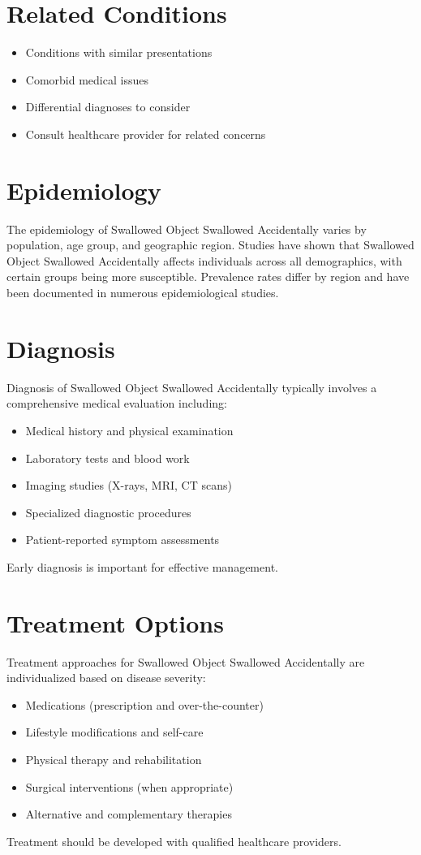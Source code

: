\section*{Related Conditions}
\begin{itemize}
  \item Conditions with similar presentations
  \item Comorbid medical issues
  \item Differential diagnoses to consider
  \item Consult healthcare provider for related concerns
\end{itemize}

\section*{Epidemiology}
The epidemiology of Swallowed Object Swallowed Accidentally varies by population, age group, and geographic region. Studies have shown that Swallowed Object Swallowed Accidentally affects individuals across all demographics, with certain groups being more susceptible. Prevalence rates differ by region and have been documented in numerous epidemiological studies.

\section*{Diagnosis}
Diagnosis of Swallowed Object Swallowed Accidentally typically involves a comprehensive medical evaluation including:
\begin{itemize}
  \item Medical history and physical examination
  \item Laboratory tests and blood work
  \item Imaging studies (X-rays, MRI, CT scans)
  \item Specialized diagnostic procedures
  \item Patient-reported symptom assessments
\end{itemize}
Early diagnosis is important for effective management.

\section*{Treatment Options}
Treatment approaches for Swallowed Object Swallowed Accidentally are individualized based on disease severity:
\begin{itemize}
  \item Medications (prescription and over-the-counter)
  \item Lifestyle modifications and self-care
  \item Physical therapy and rehabilitation
  \item Surgical interventions (when appropriate)
  \item Alternative and complementary therapies
\end{itemize}
Treatment should be developed with qualified healthcare providers.

